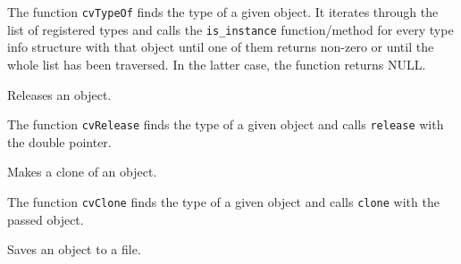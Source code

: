 \begin{description}
\end{description}

The function \texttt{cvTypeOf} finds the type of a given object. It iterates
through the list of registered types and calls the \texttt{is\_instance}
function/method for every type info structure with that object until one
of them returns non-zero or until the whole list has been traversed. In
the latter case, the function returns NULL.

\label{Release}

Releases an object.


\begin{description}
\end{description}

The function \texttt{cvRelease} finds the type of a given object and calls \texttt{release} with the double pointer.

\label{Clone}

Makes a clone of an object.


\begin{description}
\end{description}

The function \texttt{cvClone} finds the type of a given object and calls \texttt{clone} with the passed object.

\fi

\label{Save}

Saves an object to a file.


